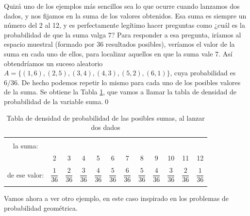 \begin{Ejemplo}
\label{cap04:ejem:VariableAleatoriaSumaDosDados}
    Quizá uno de los ejemplos más sencillos sea lo que ocurre cuando lanzamos dos dados, y nos fijamos en la suma de los valores obtenidos. Esa suma es siempre un número del 2 al 12, y es perfectamente legítimo hacer preguntas como ¿cuál es la probabilidad de que  la suma valga $7$? Para responder a esa pregunta, iríamos al espacio muestral (formado por 36 resultados posibles), veríamos el valor de la suma en cada uno de ellos, para localizar aquellos en que la suma vale $7$. Así obtendríamos un suceso aleatorio $A=\{(1,6),(2,5),(3,4),(4,3),(5,2),(6,1)\}$, cuya probabilidad es $6/36$. De hecho podemos
    repetir lo mismo para cada uno de los posibles valores de la suma. Se obtiene la Tabla \ref{cap04:tabla:probabilidadSumaDados}, que vamos a llamar la {\sf tabla de densidad} de probabilidad de la variable suma.\qed
    \begin{table}[ht]
    \begin{center}
    {\small
    \begin{tabular}[t]{|c|c|c|c|c|c|c|c|c|c|c|c|}
    \hline
    \begin{minipage}{2cm}
    \rule{0cm}{0.7cm}{\em Valor de\\ la suma:\\[2mm]}
    \end{minipage}
    &2&3&4&5&6&7&8&9&10&11&12\\
    \hline
    \begin{minipage}{2cm}
    \rule{0cm}{1cm}{\em Probabilidad\\
    de ese valor:}
    \end{minipage}
    &$\dfrac{1}{36}$&$\dfrac{2}{36}$&$\dfrac{3}{36}$&$\dfrac{4}{36}$&$\dfrac{5}{36}$&$\dfrac{6}{36}$&$\dfrac{5}{36}$&$\dfrac{4}{36}$&$\dfrac{3}{36}$&$\dfrac{2}{36}$&$\dfrac{1}{36}$\\
    &&&&&&&&&&&\\
    \hline
    \end{tabular}
    }
    \caption{Tabla de densidad de probabilidad de las posibles sumas, al lanzar dos dados}
    \label{cap04:tabla:probabilidadSumaDados}
    \end{center}
    \end{table}
\end{Ejemplo}
Vamos ahora a ver otro ejemplo, en este caso inspirado en los problemas de probabilidad geométrica.
